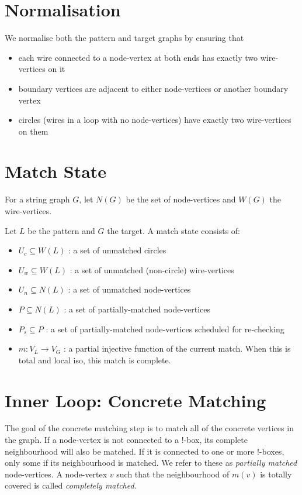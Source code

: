 \documentclass{article}
\begin{document}
\section{Normalisation}

We normalise both the pattern and target graphs by ensuring that
\begin{itemize}
\item each wire connected to a node-vertex at both ends has exactly two wire-vertices on it
\item boundary vertices are adjacent to either node-vertices or another boundary vertex
\item circles (wires in a loop with no node-vertices) have exactly two wire-vertices on them
\end{itemize}

\section{Match State}

For a string graph $G$, let $N(G)$ be the set of node-vertices and $W(G)$ the wire-vertices.

Let $L$ be the pattern and $G$ the target. A match state consists of:

\begin{itemize}
    \item $U_c \subseteq W(L)$ : a set of unmatched circles
    \item $U_w \subseteq W(L)$ : a set of unmatched (non-circle) wire-vertices
    \item $U_n \subseteq N(L)$ : a set of unmatched node-vertices
    \item $P \subseteq N(L)$ : a set of partially-matched node-vertices
    \item $P_s \subseteq P$ : a set of partially-matched node-vertices scheduled for re-checking
    \item $m : V_L \rightarrow V_G$ : a partial injective function of the current match. When this is total and local iso, this match is complete.
\end{itemize}

\section{Inner Loop: Concrete Matching}

The goal of the concrete matching step is to match all of the concrete vertices in the graph. If a node-vertex is not connected to a !-box, its complete neighbourhood will also be matched. If it is connected to one or more !-boxes, only some if its neighbourhood is matched. We refer to these as \textit{partially matched} node-vertices. A node-vertex $v$ such that the neighbourhood of $m(v)$ is totally covered is called \textit{completely matched}.
\end{document}

